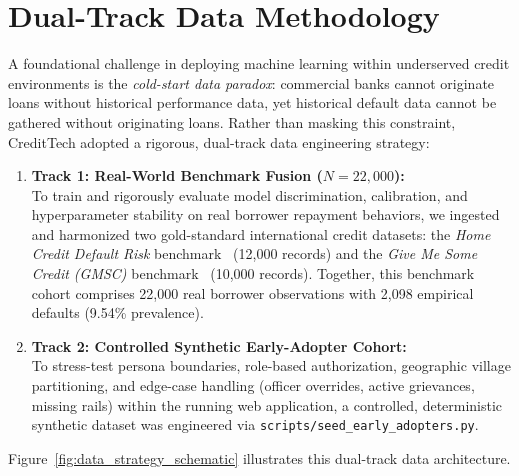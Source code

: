 \documentclass[11pt,a4paper,oneside]{report}
\begin{document}
\section{Dual-Track Data Methodology}
A foundational challenge in deploying machine learning within underserved credit environments is the \textit{cold-start data paradox}: commercial banks cannot originate loans without historical performance data, yet historical default data cannot be gathered without originating loans. Rather than masking this constraint, CreditTech adopted a rigorous, dual-track data engineering strategy:

\begin{enumerate}
  \item \textbf{Track 1: Real-World Benchmark Fusion ($N = 22,000$):}\\
  To train and rigorously evaluate model discrimination, calibration, and hyperparameter stability on real borrower repayment behaviors, we ingested and harmonized two gold-standard international credit datasets: the \textit{Home Credit Default Risk} benchmark~\cite{home_credit_2018} (12,000 records) and the \textit{Give Me Some Credit (GMSC)} benchmark~\cite{give_me_credit_2011} (10,000 records). Together, this benchmark cohort comprises 22,000 real borrower observations with 2,098 empirical defaults (9.54\% prevalence).
  
  \item \textbf{Track 2: Controlled Synthetic Early-Adopter Cohort:}\\
  To stress-test persona boundaries, role-based authorization, geographic village partitioning, and edge-case handling (officer overrides, active grievances, missing rails) within the running web application, a controlled, deterministic synthetic dataset was engineered via \texttt{scripts/seed\_early\_adopters.py}.
\end{enumerate}

Figure~\ref{fig:data_strategy_schematic} illustrates this dual-track data architecture.
\end{document}
